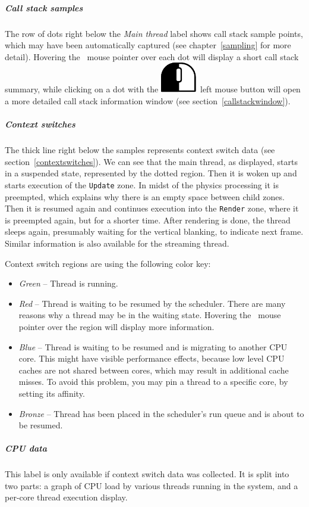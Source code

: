 \documentclass[hidelinks,titlepage,a4paper]{article}
\newcommand{\LMB}{\includegraphics[height=.8\baselineskip]{icons/lmb}}
\begin{document}
\subparagraph{Call stack samples}

The row of dots right below the \emph{Main thread} label shows call stack sample points, which may have been automatically captured (see chapter~\ref{sampling} for more detail). Hovering the \faMousePointer{}~mouse pointer over each dot will display a short call stack summary, while clicking on a dot with the \LMB{}~left mouse button will open a more detailed call stack information window (see section~\ref{callstackwindow}).

\subparagraph{Context switches}

The thick line right below the samples represents context switch data (see section~\ref{contextswitches}). We can see that the main thread, as displayed, starts in a suspended state, represented by the dotted region. Then it is woken up and starts execution of the \texttt{Update} zone. In midst of the physics processing it is preempted, which explains why there is an empty space between child zones. Then it is resumed again and continues execution into the \texttt{Render} zone, where it is preempted again, but for a shorter time. After rendering is done, the thread sleeps again, presumably waiting for the vertical blanking, to indicate next frame. Similar information is also available for the streaming thread.

Context switch regions are using the following color key:

\begin{itemize}
\item \emph{Green} -- Thread is running.
\item \emph{Red} -- Thread is waiting to be resumed by the scheduler. There are many reasons why a thread may be in the waiting state. Hovering the \faMousePointer{}~mouse pointer over the region will display more information.
\item \emph{Blue} -- Thread is waiting to be resumed and is migrating to another CPU core. This might have visible performance effects, because low level CPU caches are not shared between cores, which may result in additional cache misses. To avoid this problem, you may pin a thread to a specific core, by setting its affinity.
\item \emph{Bronze} -- Thread has been placed in the scheduler's run queue and is about to be resumed.
\end{itemize}

\subparagraph{CPU data}

This label is only available if context switch data was collected. It is split into two parts: a graph of CPU load by various threads running in the system, and a per-core thread execution display.
\end{document}

